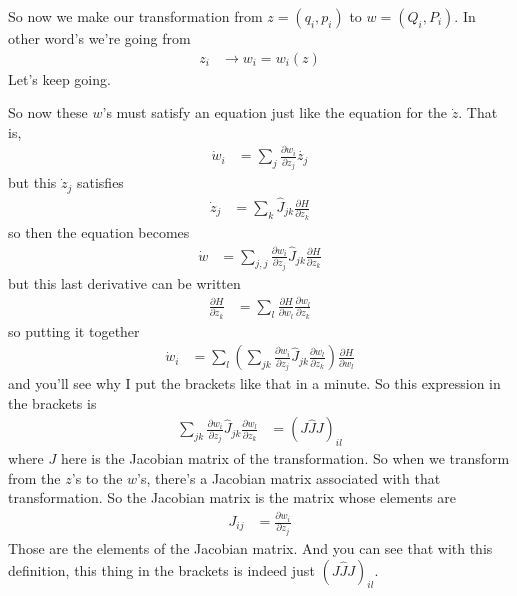 So now we make our transformation
from $z=(q_i, p_i)$ to $w=(Q_i, P_i)$.
In other word's we're going from
\begin{align}
    z_i &\to w_i = w_i(z)
\end{align}
Let's keep going.

So now these $w$'s must satisfy an equation just like the equation for the
$\dot{z}$.
That is,
\begin{align}
    \dot{w}_i &=
    \sum_{j}
    \frac{\partial w_i}{\partial z_j}
    \dot{z_j}
\end{align}
but this $\dot{z}_j$ satisfies
\begin{align}
    \dot{z}_j &=
    \sum_{k}
    \hat{J}_{jk}
    \frac{\partial H}{\partial z_k}
\end{align}
so then the equation becomes
\begin{align}
    \dot{w} &=
    \sum_{j,j}
    \frac{\partial w_i}{\partial z_j}
    \hat{J}_{jk}
    \frac{\partial H}{\partial z_k}
\end{align}
but this last derivative can be written
\begin{align}
    \frac{\partial H}{\partial z_k}
    &=
    \sum_{l}
    \frac{\partial H}{\partial w_l}
    \frac{\partial w_l}{\partial z_k}
\end{align}
so putting it together
\begin{align}
    \dot{w}_i &=
    \sum_{l}
    \left( 
    \sum_{jk}
    \frac{\partial w_i}{\partial z_j}
    \hat{J}_{jk}
    \frac{\partial w_l}{\partial z_k}
    \right)
    \frac{\partial H}{\partial w_l}
\end{align}
and you'll see why I put the brackets like that in a minute.
So this expression in the brackets is
\begin{align}
    \sum_{jk}
    \frac{\partial w_i}{\partial z_j}
    \hat{J}_{jk}
    \frac{\partial w_l}{\partial z_k}
    &=
    \left( J \hat{J} J \right)_{il}
\end{align}
where $J$ here is the Jacobian matrix of the transformation.
So when we transform from the $z$'s to the $w$'s,
there's a Jacobian matrix associated with that transformation.
So the Jacobian matrix is the matrix whose elements are
\begin{align}
    J_{ij} &=
    \frac{\partial w_i}{\partial z_j}
\end{align}
Those are the elements of the Jacobian matrix.
And you can see that with this definition,
this thing in the brackets is indeed just $\left( J \hat{J} J \right)_{il}$.

